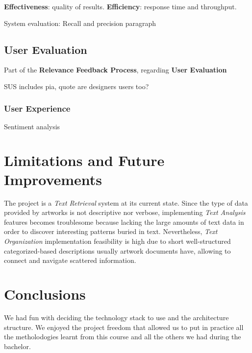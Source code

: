 \documentclass[12pt]{spieman}  %
\begin{document}
\begin{spacing}{1}
    \textbf{Effectiveness}: quality of results. \textbf{Efficiency}: response time and throughput.

    System evaluation: Recall and precision paragraph

    \subsection{User Evaluation}
    Part of the \textbf{Relevance Feedback Process}, regarding \textbf{User Evaluation}

    SUS includes pia, quote are designers users too?

    \subsubsection{User Experience}\label{sec:ux}
    Sentiment analysis


    \section{Limitations and Future Improvements}

    The project is a \textit{Text Retrieval} system at its current state.
    Since the type of data provided by artworks is not descriptive nor verbose,
    implementing \textit{Text Analysis} features becomes troublesome because lacking the large amounts of
    text data in order to discover interesting patterns buried in text.
    Nevertheless, \textit{Text Organization} implementation feasibility is high due to
    short well-structured categorized-based descriptions usually artwork documents have,
    allowing to connect and navigate scattered information.

    \section{Conclusions}
    We had fun with deciding the technology stack to use and the architecture structure.
    We enjoyed the project freedom that allowed us to put in practice all the metholodogies
    learnt from this course and all the others we had during the bachelor.


\end{spacing}
\end{document}
